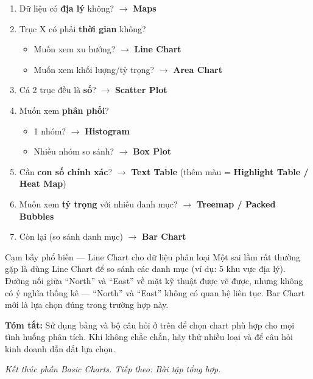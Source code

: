 \documentclass[12pt]{article}
\begin{document}
\begin{enumerate}[nosep]
    \item Dữ liệu có \textbf{địa lý} không? $\rightarrow$ \textbf{Maps}
    \item Trục X có phải \textbf{thời gian} không?
    \begin{itemize}[nosep]
        \item Muốn xem xu hướng? $\rightarrow$ \textbf{Line Chart}
        \item Muốn xem khối lượng/tỷ trọng? $\rightarrow$ \textbf{Area Chart}
    \end{itemize}
    \item Cả 2 trục đều là \textbf{số}? $\rightarrow$ \textbf{Scatter Plot}
    \item Muốn xem \textbf{phân phối}?
    \begin{itemize}[nosep]
        \item 1 nhóm? $\rightarrow$ \textbf{Histogram}
        \item Nhiều nhóm so sánh? $\rightarrow$ \textbf{Box Plot}
    \end{itemize}
    \item Cần \textbf{con số chính xác}? $\rightarrow$ \textbf{Text Table} (thêm màu = \textbf{Highlight Table / Heat Map})
    \item Muốn xem \textbf{tỷ trọng} với nhiều danh mục? $\rightarrow$ \textbf{Treemap / Packed Bubbles}
    \item Còn lại (so sánh danh mục) $\rightarrow$ \textbf{Bar Chart}
\end{enumerate}

\begin{warningbox}{Cạm bẫy phổ biến --- Line Chart cho dữ liệu phân loại}
Một sai lầm rất thường gặp là dùng Line Chart để so sánh các danh mục (ví dụ: 5 khu vực địa lý). Đường nối giữa ``North'' và ``East'' về mặt kỹ thuật được vẽ được, nhưng không có ý nghĩa thống kê --- ``North'' và ``East'' không có quan hệ liên tục. Bar Chart mới là lựa chọn đúng trong trường hợp này.
\end{warningbox}

\noindent \textbf{Tóm tắt:} Sử dụng bảng và bộ câu hỏi ở trên để chọn chart phù hợp cho mọi tình huống phân tích. Khi không chắc chắn, hãy thử nhiều loại và để câu hỏi kinh doanh dẫn dắt lựa chọn.

\vspace{1em}
\noindent \textit{Kết thúc phần Basic Charts. Tiếp theo: Bài tập tổng hợp.}
\end{document}
